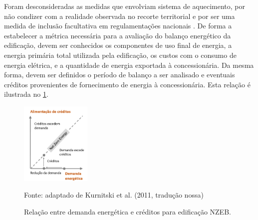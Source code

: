 \noindent Foram desconsideradas as medidas que envolviam sistema de aquecimento, por não condizer com a realidade observada no recorte territorial e por ser uma medida de inclusão facultativa em regulamentações nacionais \cite{InstitutoNacionaldeMetrologiaNormalizacaoeQualidadeIndustrial-INMETRO2018,InstitutoNacionaldeMetrologiaNormalizacaoeQualidadeIndustrial-INMETRO2018a}. De forma a estabelecer a métrica necessária para a avaliação do balanço energético da edificação, devem ser conhecidos os componentes de uso final de energia, a energia primária total utilizada pela edificação, os custos com o consumo de energia elétrica, e a quantidade de energia exportada à concessionária. Da mesma forma, devem ser definidos o período de balanço a ser analisado e eventuais créditos provenientes de fornecimento de energia à concessionária. Esta relação é ilustrada no \ref{fig:figura99}.%

    \begin{figure}
        \centering
        \caption{\small Relação entre demanda energética e créditos para edificação NZEB.}
        \begin{minipage}[ht]{1\textwidth}\centering
            \includegraphics[width=0.3\textwidth]{figures/esquema_iea_2014-2.png}            
        \end{minipage}
        \begin{flushleft}
            \par Fonte: adaptado de Kurnitski et al. (2011, tradução nossa)
        \end{flushleft}
        \label{fig:figura99}
    \end{figure}
